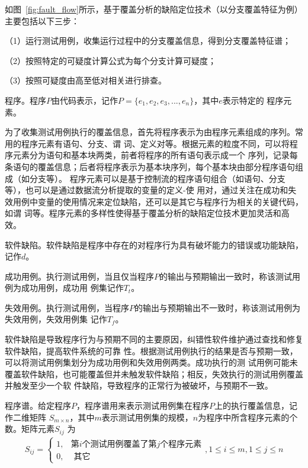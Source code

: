 如图~\ref{fig:fault_flow}所示，基于覆盖分析的缺陷定位技术（以分支覆盖特征为例）主要包括以下三步：

（1）运行测试用例，收集运行过程中的分支覆盖信息，得到分支覆盖特征谱；

（2）按照特定的可疑度计算公式为每个分支计算可疑度；

（3）按照可疑度由高至低对相关进行排查。 

\begin{Definition}
      程序。程序$P$由代码表示，记作$P=\{e_1, e_2, e_3, ..., e_n\}$，其中$e$表示特定的
      程序元素。
\end{Definition}

为了收集测试用例执行的覆盖信息，首先将程序表示为由程序元素组成的序列。常用的程序元素有语句、分支、谓
词、定义对等。根据元素的粒度不同，可以将程序元素分为语句和基本块两类，前者将程序的所有语句表示成一个
序列，记录每条语句的覆盖信息；后者将程序表示为基本块序列，每个基本块由部分程序语句组成（如分支等）。
程序元素可以是基于控制流的程序语句组合（如语句、分支等），也可以是通过数据流分析提取的变量的定义-使
用对，通过关注在成功和失效用例中变量的使用情况来定位缺陷，还可以是其它与程序行为相关的关键代码，如谓
词等。程序元素的多样性使得基于覆盖分析的缺陷定位技术更加灵活和高效。

\begin{Definition}
      软件缺陷。软件缺陷是程序中存在的对程序行为具有破坏能力的错误或功能缺陷，记作$d$。
\end{Definition}

\begin{Definition}
      成功用例。执行测试用例，当且仅当程序$P$的输出与预期输出一致时，称该测试用例为成功用例，成功用
      例集记作$T_t$。
\end{Definition}

\begin{Definition}
      失效用例。执行测试用例，当程序$P$的输出与预期输出不一致时，称该测试用例为失效用例，失效用例集
      记作$T_f$。
\end{Definition}

软件缺陷是导致程序行为与预期不同的主要原因，纠错性软件维护通过查找和修复软件缺陷，提高软件系统的可靠
性。根据测试用例执行的结果是否与预期一致，可以将测试用例集划分为成功用例和失效用例两类。成功执行的测
试用例可能未覆盖软件缺陷，也可能覆盖但并未触发软件缺陷；相反，失效执行的测试用例覆盖并触发至少一个软
件缺陷，导致程序的正常行为被破坏，与预期不一致。

\begin{Definition}
      程序谱。给定程序$P$，程序谱用来表示测试用例集在程序$P$上的执行覆盖信息，记作二维矩阵
      $S_{m\times n}$，其中$m$表示测试用例集的规模，$n$为程序中所含程序元素的个数。矩阵元素$S_{ij}$
      为
      \begin{eqnarray}
         S_{ij} = \begin{cases} 1, & \mbox{第}i\mbox{个测试用例覆盖了第}j\mbox{个程序元素} \\ 
  0, & \text{ 其它 }  
  \end{cases}   , 1 \leqslant i \leqslant  m, 1 \leqslant j \leqslant n
      \end{eqnarray}
\end{Definition}

